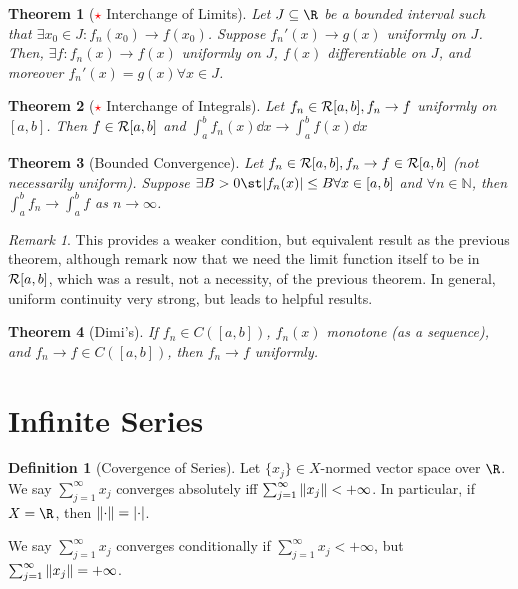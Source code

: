 \documentclass[12pt, oneside]{article}
\theoremstyle{definition}
\newtheorem{defn}{Definition}
\theoremstyle{plain}
\newtheorem{thm}{Theorem}
\theoremstyle{remark}
\newtheorem{remark}{Remark}
\let\origsection=\section
\renewcommand\section[1]{\origsection{#1}\label{sec:\thesection}}
\begin{document}
\begin{thm}[\textcolor{red}{$\star$} Interchange of Limits]
  Let $J \subseteq \R$ be a bounded interval such that $\exists x_0 \in J : f_n(x_0) \to f(x_0)$. Suppose $f_n'(x) \to g(x)$ uniformly on $J$. Then, $\exists f : f_n (x) \to f(x)$ uniformly on $J$, $f(x)$ differentiable on $J$, and moreover $f_n'(x) = g(x) \forall x \in J$.
\end{thm}

\begin{thm}[\textcolor{red}{$\star$} Interchange of Integrals]
  Let  $f_n \in \mathcal{R}[a, b], f_n \to f$ uniformly on $[a, b]$. Then $f \in \mathcal{R}[a, b]$ and $\int_a^b f_n(x) \dd{x} \to \int_a^b f(x) \dd{x}$
\end{thm}
\begin{thm}[Bounded Convergence]
  Let $f_n \in \mathcal{R}[a, b], f_n \to f \in \mathcal{R}[a, b]$ (not necessarily uniform). Suppose $\exists B > 0 \st \abs{f_n(x)} \leq B \forall x \in [a, b]$ and $\forall n \in \mathbb{N}$, then $\int_a^b f_n \to \int_a^b f$ as $n \to \infty$.
\end{thm}
\begin{remark}
  This provides a weaker condition, but equivalent result as the previous theorem, although remark now that we need the limit function itself to be in $\mathcal{R}[a, b]$, which was a result, not a necessity, of the previous theorem. In general, uniform continuity very strong, but leads to helpful results.
\end{remark}

\begin{thm}[Dimi's]
  If $f_n \in C([a, b])$, $f_n(x)$ monotone (as a sequence), and $f_n \to f \in C([a, b])$, then $f_n \to f$ uniformly.
\end{thm}

\section{Infinite Series}

\begin{defn}[Covergence of Series]
  Let $\{x_j\} \in X$-normed vector space over $\R$. We say $\sum_{j=1}^\infty x_j$ converges absolutely iff $\sum_{j=1}^\infty \norm{x_j} < + \infty$. In particular, if $X = \R$, then $\norm{\cdot} = \abs{\cdot }$.

  We say $\sum_{j=1}^\infty x_j$ converges conditionally if $\sum_{j=1}^\infty x_j < +\infty$, but $\sum_{j=1}^\infty \norm{x_j} = +\infty$.
\end{defn}
\end{document}
